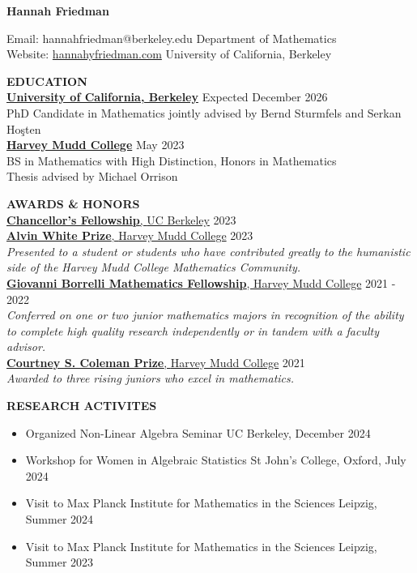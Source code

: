\documentclass[11pt]{article}
\newcommand{\hdr}[1]{\textcolor{blue(ryb)}{\textbf{#1}}}
\newcommand{\role}[3]{\underline{\textbf{#1}, {#2}} \hfill #3}
\begin{document}
\begin{center}
\hdr{\Large{Hannah Friedman}}\\
\end{center}
Email: hannahfriedman@berkeley.edu \hfill Department of Mathematics\\
Website: \url{hannahyfriedman.com} \hfill University of California, Berkeley

\bigskip
\raggedright
\hdr{EDUCATION}\\
\textbf{\underline{University of California, Berkeley}} \hfill Expected December 2026\\
PhD Candidate in Mathematics jointly advised by Bernd Sturmfels and Serkan Ho\c{s}ten\\
\textbf{\underline{Harvey Mudd College}} \hfill May 2023\\
BS in Mathematics with High Distinction, Honors in Mathematics\\
Thesis advised by Michael Orrison

\bigskip

\hdr{AWARDS \& HONORS}\\
\role{Chancellor's Fellowship}{UC Berkeley}{2023}\\
\role{Alvin White Prize}{Harvey Mudd College}{2023}\\
\textit{Presented to a student or students who have contributed greatly to the humanistic side of the Harvey Mudd College Mathematics Community.}\\
\role{Giovanni Borrelli Mathematics Fellowship}{Harvey Mudd College}{2021 - 2022}\\
\textit{Conferred on one or two junior mathematics majors in recognition of the ability to complete high quality research independently or in tandem with a faculty advisor.}\\
\role{Courtney S. Coleman Prize}{Harvey Mudd College}{2021}\\
\textit{Awarded to three rising juniors who excel in mathematics.}

\bigskip

\hdr{RESEARCH ACTIVITES}\\
\begin{itemize}
  \item Organized Non-Linear Algebra Seminar \hfill UC Berkeley, December 2024
  \item Workshop for Women in Algebraic Statistics \hfill St John's College, Oxford, July 2024
  \item Visit to Max Planck Institute for Mathematics in the Sciences \hfill Leipzig, Summer 2024
  \item Visit to Max Planck Institute for Mathematics in the Sciences \hfill Leipzig, Summer 2023
\end{itemize}
\end{document}

